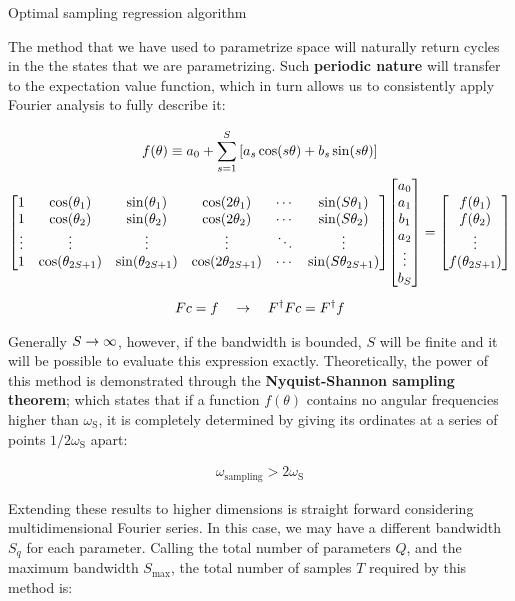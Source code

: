\documentclass[9pt, handout, aspectratio=169]{beamer}	%
\begin{document}
\begin{frame}[allowframebreaks]{Optimal sampling regression algorithm}

	The method that we have used to parametrize space will naturally return cycles in the the states that we are parametrizing. Such \textbf{periodic nature} will transfer to the expectation value function, which in turn allows us to consistently apply Fourier analysis to fully describe it:

	\begin{gather*}
	  f(\theta) \equiv a_0 + \sum_{s=1}^S \qty[a_s\cos(s\theta) + b_s\sin(s\theta)] \\
	  \mqty[
	    1 & \cos(\theta_1) & \sin(\theta_1) & \cos(2\theta_1)
	      & \cdots & \sin(S\theta_1) \\
	    1 & \cos(\theta_2) & \sin(\theta_2) & \cos(2\theta_2)
	      & \cdots & \sin(S\theta_2) \\
	    \vdots & \vdots & \vdots & \vdots & \ddots & \vdots \\
	    1 & \cos(\theta_{2S+1}) & \sin(\theta_{2S+1}) & \cos(2\theta_{2S+1})
	      & \cdots & \sin(S\theta_{2S+1})
	  ]
	  \mqty[
	    a_0 \\ a_1 \\ b_1 \\ a_2 \\ \vdots \\ b_S
	  ] =
	  \mqty[
	    f(\theta_1) \\ f(\theta_2) \\ \vdots \\ f(\theta_{2S+1})
	  ] \\[5pt]
	  Fc = f \qra F^{\dagger}Fc = F^{\dagger}f
	\end{gather*}

\break

	Generally $S \rightarrow \infty$, however, if the bandwidth is bounded, $S$ will be finite and it will be possible to evaluate this expression exactly. Theoretically, the power of this method is demonstrated through the \textbf{Nyquist-Shannon sampling theorem}; which states that if a function $f(\theta)$ contains no angular frequencies higher than $\omega_{\text{S}}$, it is completely determined by giving its ordinates at a series of points $1/2\omega_{\text{S}}$ apart:

	\begin{gather*}
	  \omega_{\text{sampling}} > 2\omega_{\text{S}}
	\end{gather*}

	Extending these results to higher dimensions is straight forward considering multidimensional Fourier series. In this case, we may have a different bandwidth $S_{q}$ for each parameter. Calling the total number of parameters $Q$, and the maximum bandwidth $S_{\text{max}}$, the total number of samples $T$ required by this method is:


\end{frame}
\end{document}
